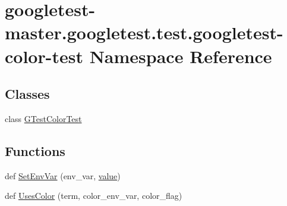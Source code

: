 \hypertarget{namespacegoogletest-master_1_1googletest_1_1test_1_1googletest-color-test}{}\section{googletest-\/master.googletest.\+test.\+googletest-\/color-\/test Namespace Reference}
\label{namespacegoogletest-master_1_1googletest_1_1test_1_1googletest-color-test}
\subsection*{Classes}
\begin{DoxyCompactItemize}
\item 
class \mbox{\hyperlink{classgoogletest-master_1_1googletest_1_1test_1_1googletest-color-test_1_1_g_test_color_test}{G\+Test\+Color\+Test}}
\end{DoxyCompactItemize}
\subsection*{Functions}
\begin{DoxyCompactItemize}
\item 
def \mbox{\hyperlink{namespacegoogletest-master_1_1googletest_1_1test_1_1googletest-color-test_a819cae823706e5a48aebd10a81fa11e8}{Set\+Env\+Var}} (env\+\_\+var, \mbox{\hyperlink{_obj__test_2lib_2googletest-master_2googlemock_2test_2gmock-matchers__test_8cc_a337b8a670efc0b086ad3af163f3121b6}{value}})
\item 
def \mbox{\hyperlink{namespacegoogletest-master_1_1googletest_1_1test_1_1googletest-color-test_a805b9485c9d2f221b81a93ec3cf3cab0}{Uses\+Color}} (term, color\+\_\+env\+\_\+var, color\+\_\+flag)
\end{DoxyCompactItemize}
